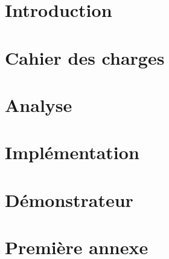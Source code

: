 \documentclass[
    reds, %
    ie, %
]{heig-tb}
\begin{document}
\maketitle
\frontmatter
\clearemptydoublepage

\preamble
\authentification

\begin{abstract}
    
\end{abstract}

\clearemptydoublepage
{
    \tableofcontents
    \let\cleardoublepage\clearpage
    \listoffigures
    \let\cleardoublepage\clearpage
    \listoftables
    \let\cleardoublepage\clearpage
    \listoflistings
}

\printnomenclature
\clearemptydoublepage
{}

\mainmatter
\chapter{Introduction}

\chapter{Cahier des charges}

\chapter{Analyse}

\chapter{Implémentation}

\chapter{Démonstrateur}


\appendix
\appendixpage
\addappheadtotoc

\chapter{Première annexe}

\let\cleardoublepage\clearpage
\backmatter
\label{glossaire}
\printnoidxglossary
\printbibliography
\label{index}
\printindex
\end{document}
